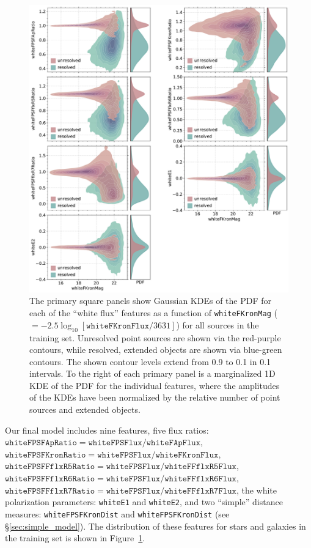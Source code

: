 \documentclass[twocolumn]{aastex63}
\begin{document}
\begin{figure}
    \centering
    \includegraphics[width=6.5in]{./figures/whiteFeatures.pdf}
    \caption{The primary square panels show Gaussian KDEs of the PDF for each
    of the ``white flux'' features as a function of \texttt{whiteFKronMag}
    ($=-2.5\log_{10}[\mathtt{whiteFKronFlux}/3631]$) for all sources in the
    training set. Unresolved point sources are shown via the red-purple
    contours, while resolved, extended objects are shown via blue-green
    contours. The shown contour levels extend from 0.9 to 0.1 in 0.1
    intervals. To the right of each primary panel is a marginalized 1D KDE of
    the PDF for the individual features, where the amplitudes of the KDEs have
    been normalized by the relative number of point sources and extended
    objects.}
    \label{fig:features}
\end{figure} 

Our final model includes nine features, five flux ratios:\\
$\mathtt{whiteFPSFApRatio} = \mathtt{whiteFPSFlux/whiteFApFlux}$,
$\mathtt{whiteFPSFKronRatio} = \mathtt{whiteFPSFlux/whiteFKronFlux}$,
$\mathtt{whiteFPSFFflxR5Ratio} = \mathtt{whiteFPSFlux/whiteFFflxR5Flux}$,
$\mathtt{whiteFPSFFflxR6Ratio} = \mathtt{whiteFPSFlux/whiteFFflxR6Flux}$,
$\mathtt{whiteFPSFFflxR7Ratio} = \mathtt{whiteFPSFlux/whiteFFflxR7Flux}$, the
white polarization parameters: \texttt{whiteE1} and \texttt{whiteE2}, and two
``simple'' distance measures: \texttt{whiteFPSFKronDist} and
\texttt{whiteFPSFKronDist} (see \S\ref{sec:simple_model}). The distribution of
these features for stars and galaxies in the training set is shown in
Figure~\ref{fig:features}.
\end{document}
